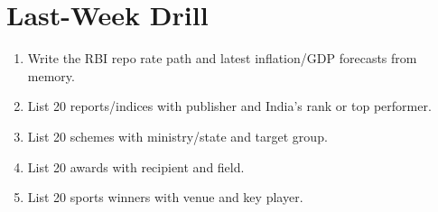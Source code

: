 \documentclass[10pt,a4paper]{article}
\begin{document}
\section{Last-Week Drill}
\begin{enumerate}
    \item Write the RBI repo rate path and latest inflation/GDP forecasts from memory.
    \item List 20 reports/indices with publisher and India's rank or top performer.
    \item List 20 schemes with ministry/state and target group.
    \item List 20 awards with recipient and field.
    \item List 20 sports winners with venue and key player.
\end{enumerate}
\end{document}
